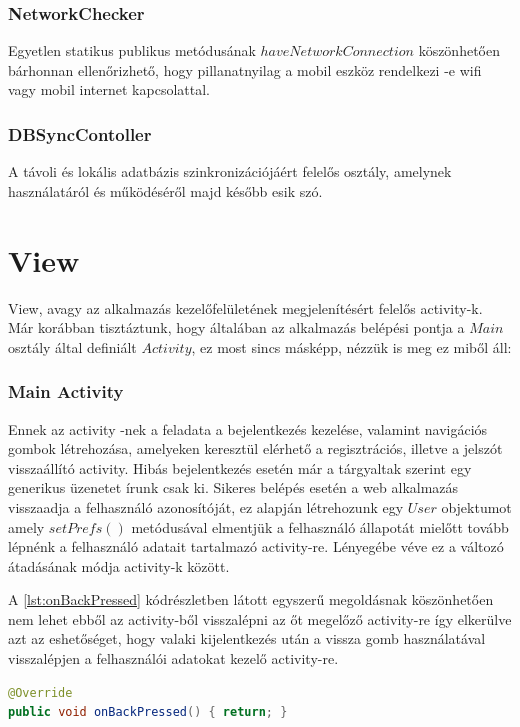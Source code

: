 \documentclass[12pt]{report}
\theoremstyle{definition}
\begin{document}
	\subsubsection{NetworkChecker}
	Egyetlen statikus publikus metódusának $haveNetworkConnection$ köszönhetően bárhonnan ellenőrizhető, hogy pillanatnyilag a mobil eszköz rendelkezi -e wifi vagy mobil internet kapcsolattal. 
	
	\subsubsection{DBSyncContoller}
	A távoli és lokális adatbázis szinkronizációjáért felelős osztály, amelynek használatáról és működéséről majd később esik szó.
	
	\section{View}
	View, avagy az alkalmazás kezelőfelületének megjelenítésért felelős activity-k. Már korábban tisztáztunk, hogy általában az alkalmazás belépési pontja a $Main$ osztály által definiált $Activity$, ez most sincs másképp, nézzük is meg ez miből áll:
	
	\subsubsection{Main Activity}
	Ennek az activity -nek a feladata a bejelentkezés kezelése, valamint navigációs gombok létrehozása, amelyeken keresztül elérhető a regisztrációs, illetve a jelszót visszaállító activity. Hibás bejelentkezés esetén már a tárgyaltak szerint egy generikus üzenetet írunk csak ki. Sikeres belépés esetén a web alkalmazás visszaadja a felhasználó azonosítóját, ez alapján létrehozunk egy $User$ objektumot amely $setPrefs\left(\right)$ metódusával elmentjük a felhasználó állapotát mielőtt tovább lépnénk a felhasználó adatait tartalmazó activity-re. Lényegébe véve ez a változó átadásának módja activity-k között.
	
	A \ref{lst:onBackPressed} kódrészletben látott egyszerű megoldásnak köszönhetően nem lehet ebből az activity-ből visszalépni az őt megelőző activity-re így elkerülve azt az eshetőséget, hogy valaki kijelentkezés után a vissza gomb használatával visszalépjen a felhasználói adatokat kezelő activity-re.
	
	\noindent\begin{minipage}{\linewidth}
		\begin{lstlisting}[language=java,label={lst:onBackPressed}, caption={Vissza gomb letiltása}]
@Override
public void onBackPressed() { return; }
		\end{lstlisting}
	\end{minipage}
	
\end{document}
